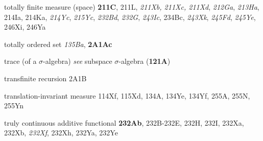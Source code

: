 



totally finite measure (space) {\bf 211C}, 211L, {\it 211Xb, 211Xc, 211Xd},
{\it 212Ga}, {\it 213Ha}, 214Ia, 214Ka, {\it 214Yc}, {\it 215Yc},
{\it 232Bd}, {\it 232G}, {\it 243Ic}, 234Bc, {\it 243Xk}, {\it 245Fd},
{\it 245Ye}, 246Xi, 246Ya







totally ordered set {\it 135Ba}, {\bf
  2A1Ac}
  










{trace }
(of a $\sigma$-algebra) {\it see} subspace $\sigma$-algebra ({\bf 121A})



transfinite recursion 2A1B

















{translation-invariant }
measure 114Xf, 115Xd, 134A, 134Ye, 134Yf,
  255A, 255N, 255Yn
  















truly continuous additive functional {\bf 232Ab},
232B-232E, 
232H, 232I, 232Xa, 232Xb, {\it 232Xf}, 232Xh, 232Ya, 232Ye

























